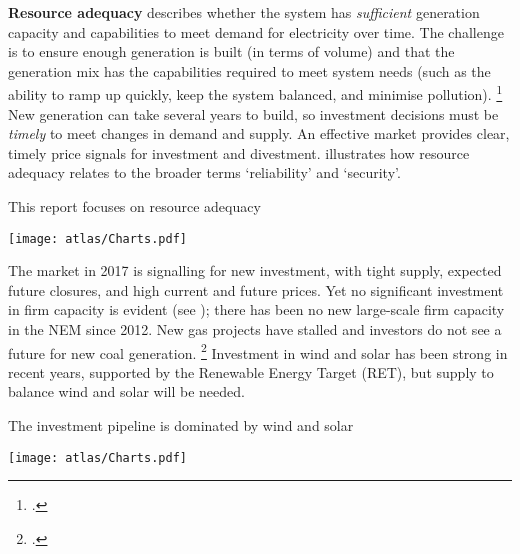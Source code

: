\documentclass[FrontPage]{grattan}
\begin{document}
\textbf{Resource adequacy} describes whether the system has \emph{sufficient} generation capacity and capabilities to meet demand for electricity over time. The challenge is to ensure enough generation is built (in terms of volume) and that the generation mix has the capabilities required to meet system needs (such as the ability to ramp up quickly, keep the system balanced, and minimise pollution).%
\footcite{Simshauser2010ResourceAdequacy}
New generation can take several years to build, so investment decisions must be \emph{timely} to meet changes in demand and supply. An effective market provides clear, timely price signals for investment and divestment.  illustrates how resource adequacy relates to the broader terms `reliability' and `security'.

\begin{figureTop}
\caption{This report focuses on resource adequacy}\label{fig:resource-adequacy-is-the-focus-of-this-report}
\units{}
\texttt{[image: atlas/Charts.pdf]}
\end{figureTop}

The market in 2017 is signalling for new investment, with tight supply, expected future closures, and high current and future prices. Yet no significant investment in firm capacity is evident (see ); there has been no new large-scale firm capacity in the NEM since 2012. New gas projects have stalled and investors do not see a future for new coal generation.%
\footcite{AEC2017CoalInTheNEM}
Investment in wind and solar has been strong in recent years, supported by the Renewable Energy Target (RET), but supply to balance wind and solar will be needed.

\begin{figureTop}
\caption{The investment pipeline is dominated by wind and solar}\label{fig:investment-pipeline-is-predominantly-wind-and-solar}
\texttt{[image: atlas/Charts.pdf]}
\end{figureTop}
\end{document}
